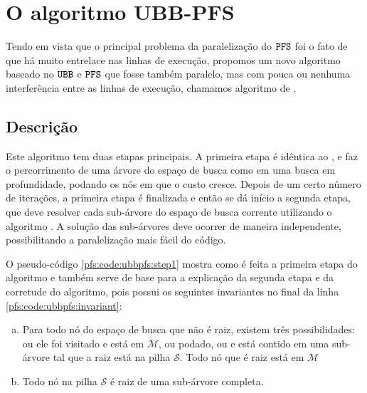 \section{O algoritmo UBB-PFS}
Tendo em vista que o principal problema da paralelização do 
$\texttt{PFS}$ foi o fato de que há muito entrelace nas linhas de 
execução, propomos um novo algoritmo baseado no $\texttt{UBB}$ e 
$\texttt{PFS}$ que fosse também paralelo, mas com pouca ou nenhuma 
interferência entre as linhas de execução, chamamos algoritmo de 
.

\subsection{Descrição}
Este algoritmo tem duas etapas principais. A primeira etapa é idêntica
ao , e faz o percorrimento de uma árvore do espaço de busca
como em uma busca em profundidade, podando os nós em que o custo cresce.
Depois de um certo número de iterações, a primeira etapa é finalizada e 
então se dá início a segunda etapa, que deve resolver cada sub-árvore 
do espaço de busca corrente utilizando o algoritmo . A 
solução das sub-árvores deve ocorrer de maneira independente, 
possibilitando a paralelização mais fácil do código.

O pseudo-código \ref{pfs:code:ubbpfs:step1} mostra como é feita a 
primeira etapa do algoritmo e também serve de base para a explicação da
segunda etapa  e da corretude do algoritmo, pois 
possui os seguintes invariantes no final da linha 
\ref{pfs:code:ubbpfs:invariant}:
\begin{enumerate}[a)]
    \item{Para todo nó do espaço de busca que não é raiz, existem três 
        possibilidades: ou ele foi visitado e está em $\mathcal{M}$, ou 
        podado, ou e está contido em uma sub-árvore tal que a raiz está 
        na pilha $\mathcal{S}$. Todo nó que é raiz está em 
        $\mathcal{M}$} \label{pfs:code:ubb:invariant:A}
    \item{Todo nó na pilha $\mathcal{S}$ é raiz de uma sub-árvore 
        completa.} \label{pfs:code:ubb:invariant:B}
\end{enumerate}

